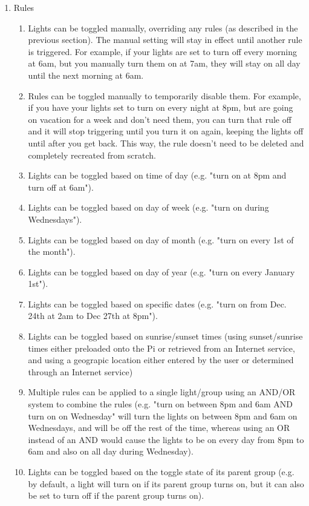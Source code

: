 \documentclass[12pt]{article}
\begin{document}
\begin{enumerate}
    \item Rules
        \begin{enumerate}
            \item Lights can be toggled manually, overriding any rules (as described in the previous section). The manual setting will stay in effect until another rule is triggered. For example, if your lights are set to turn off every morning at 6am, but you manually turn them on at 7am, they will stay on all day until the next morning at 6am.
            \item Rules can be toggled manually to temporarily disable them.  For example, if you have your lights set to turn on every night at 8pm, but are going on vacation for a week and don't need them, you can turn that rule off and it will stop triggering until you turn it on again, keeping the lights off until after you get back. This way, the rule doesn't need to be deleted and completely recreated from scratch.
            \item Lights can be toggled based on time of day (e.g. "turn on at 8pm and turn off at 6am").
            \item Lights can be toggled based on day of week (e.g. "turn on during Wednesdays").
            \item Lights can be toggled based on day of month (e.g. "turn on every 1st of the month").
            \item Lights can be toggled based on day of year (e.g. "turn on every January 1st").
            \item Lights can be toggled based on specific dates (e.g. "turn on from Dec. 24th at 2am to Dec 27th at 8pm").
            \item Lights can be toggled based on sunrise/sunset times (using sunset/sunrise times either preloaded onto the Pi or retrieved from an Internet service, and using a geograpic location either entered by the user or determined through an Internet service)
            \item Multiple rules can be applied to a single light/group using an AND/OR system to combine the rules (e.g. "turn on between 8pm and 6am AND turn on on Wednesday" will turn the lights on between 8pm and 6am on Wednesdays, and will be off the rest of the time, whereas using an OR instead of an AND would cause the lights to be on every day from 8pm to 6am and also on all day during Wednesday).
            \item Lights can be toggled based on the toggle state of its parent group (e.g. by default, a light will turn on if its parent group turns on, but it can also be set to turn off if the parent group turns on).

\end{enumerate}
\end{enumerate}
\end{document}
